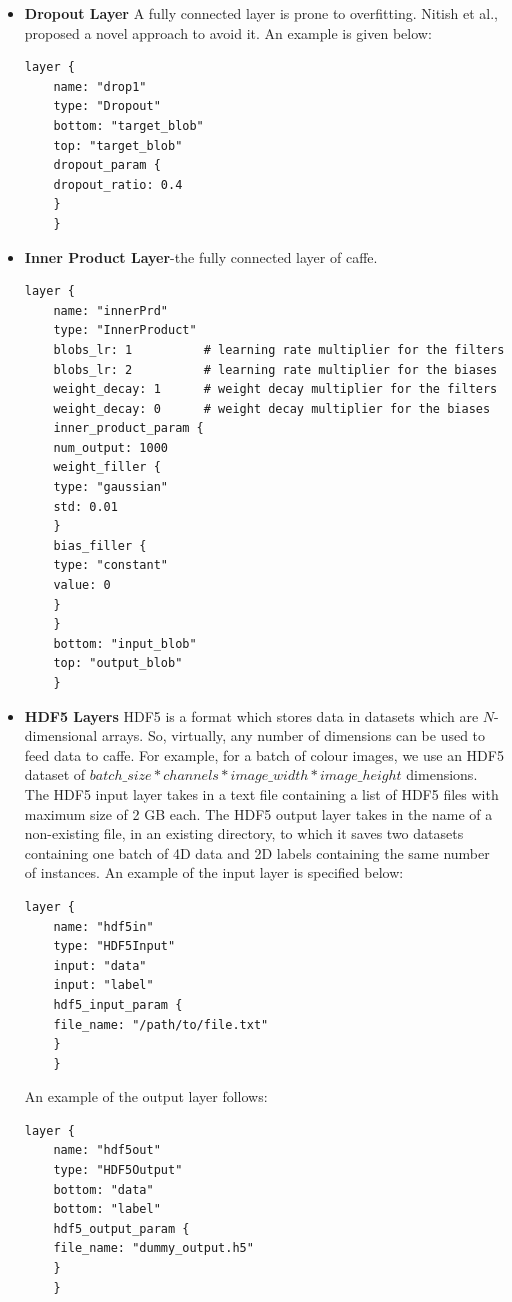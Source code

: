\documentclass{article}
\begin{document}
\begin{itemize}
	\item \textbf{Dropout Layer}
	A fully connected layer is prone to overfitting. Nitish et al.,\cite{dropout} proposed a novel approach to avoid it. An example is given below:
	\begin{lstlisting}[tabsize=2,breaklines=true]
	layer { 
	name: "drop1" 
	type: "Dropout" 
	bottom: "target_blob" 
	top: "target_blob" 
	dropout_param { 
	dropout_ratio: 0.4 
	} 
	}
	\end{lstlisting}
	
	\item \textbf{Inner Product Layer}-the fully connected layer of caffe.
	\begin{lstlisting}[tabsize=2,breaklines=true]
	layer {
	name: "innerPrd"
	type: "InnerProduct"
	blobs_lr: 1          # learning rate multiplier for the filters
	blobs_lr: 2          # learning rate multiplier for the biases
	weight_decay: 1      # weight decay multiplier for the filters
	weight_decay: 0      # weight decay multiplier for the biases
	inner_product_param {
	num_output: 1000
	weight_filler {
	type: "gaussian"
	std: 0.01
	}
	bias_filler {
	type: "constant"
	value: 0
	}
	}
	bottom: "input_blob"
	top: "output_blob"
	}
	\end{lstlisting}
	\item \textbf{HDF5 Layers}
	HDF5 is a format which stores data in datasets which are $N$-dimensional arrays. So, virtually, any number of dimensions can be used to feed data to caffe. For example, for a batch of colour images, we use an HDF5 dataset of $batch\_size * channels * image\_width * image\_height$ dimensions. The HDF5 input layer takes in a text file containing a list of HDF5 files with maximum size of 2 GB each. The HDF5 output layer takes in the name of a non-existing file, in an existing directory, to which it saves two datasets containing one batch of 4D data and 2D labels containing the same number of instances. An example of the input layer is specified below:
	\begin{lstlisting}[tabsize=2,breaklines=true]
	layer {
	name: "hdf5in"
	type: "HDF5Input"
	input: "data"
	input: "label"
	hdf5_input_param {
	file_name: "/path/to/file.txt"
	}
	}
	\end{lstlisting}
	
	An example of the output layer follows:
	\begin{lstlisting}[tabsize=2,breaklines=true]
	layer {
	name: "hdf5out"
	type: "HDF5Output"
	bottom: "data"
	bottom: "label"
	hdf5_output_param {
	file_name: "dummy_output.h5"
	}
	}
	\end{lstlisting}
	

\end{itemize}
\end{document}
